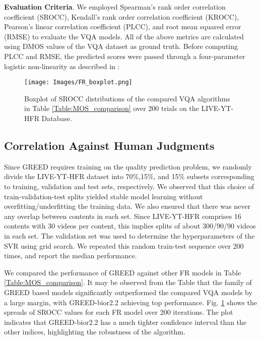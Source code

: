 \documentclass[journal]{IEEEtran}
\begin{document}
\textbf{Evaluation Criteria}.
We employed Spearman's rank order correlation coefficient (SROCC), Kendall's rank order correlation coefficient (KROCC), Pearson's linear correlation coefficient (PLCC), and root mean squared error (RMSE) to evaluate the VQA models. All of the above metrics are calculated using DMOS values of the VQA dataset as ground truth. Before computing PLCC and RMSE, the predicted scores were passed through a four-parameter logistic non-linearity as described in \cite{VQEG2000}:


\begin{figure}[t]
    \centering
    \texttt{[image: Images/FR\_boxplot.png]}
    \caption{Boxplot of SROCC distributions of the compared VQA algorithms in Table \ref{Table:MOS_comparison} over 200 trials on the LIVE-YT-HFR Database.}
    \label{fig:FR_boxplot}
\end{figure}

\subsection{Correlation Against Human Judgments}
Since GREED requires training on the quality prediction problem, we randomly divide the LIVE-YT-HFR dataset into 70\%,15\%, and 15\% subsets corresponding to training, validation and test sets, respectively. We observed that this choice of train-validation-test splits yielded stable model learning without overfitting/underfitting the training data. We also ensured that there was never any overlap between contents in each set. Since LIVE-YT-HFR comprises 16 contents with 30 videos per content, this implies splits of about 300/90/90 videos in each set. The validation set was used to determine the hyperparameters of the SVR using grid search. We repeated this random train-test sequence over 200 times, and report the median performance.

We compared the performance of GREED against other FR models in Table \ref{Table:MOS_comparison}. It may be observed from the Table that the family of GREED based models significantly outperformed the compared VQA models by a large margin, with GREED-bior2.2 achieving top performance. Fig. \ref{fig:FR_boxplot} shows the spreads of SROCC values for each FR model over 200 iterations. The plot indicates that GREED-bior2.2 has a much tighter confidence interval than the other indices, highlighting the robustness of the algorithm.
\end{document}
